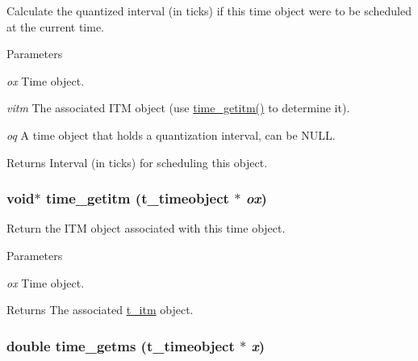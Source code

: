 Calculate the quantized interval (in ticks) if this time object were to be scheduled at the current time. 
\begin{DoxyParams}{Parameters}
\item[{\em ox}]Time object. \item[{\em vitm}]The associated ITM object (use \hyperlink{group__time_gaa1d217d3b706f718f0f77dbd78427fb0}{time\_\-getitm()} to determine it). \item[{\em oq}]A time object that holds a quantization interval, can be NULL. \end{DoxyParams}
\begin{DoxyReturn}{Returns}
Interval (in ticks) for scheduling this object. 
\end{DoxyReturn}
\hypertarget{group__time_gaa1d217d3b706f718f0f77dbd78427fb0}{
\subsubsection[{time\_\-getitm}]{\setlength{\rightskip}{0pt plus 5cm}void$\ast$ time\_\-getitm ({\bf t\_\-timeobject} $\ast$ {\em ox})}}
\label{group__time_gaa1d217d3b706f718f0f77dbd78427fb0}


Return the ITM object associated with this time object. 
\begin{DoxyParams}{Parameters}
\item[{\em ox}]Time object. \end{DoxyParams}
\begin{DoxyReturn}{Returns}
The associated \hyperlink{group__time_gac656fa1f920c69cf77e6631bcec53077}{t\_\-itm} object. 
\end{DoxyReturn}
\hypertarget{group__time_ga714ddc564124f89899dc619137f5c64d}{
\subsubsection[{time\_\-getms}]{\setlength{\rightskip}{0pt plus 5cm}double time\_\-getms ({\bf t\_\-timeobject} $\ast$ {\em x})}}
\label{group__time_ga714ddc564124f89899dc619137f5c64d}


